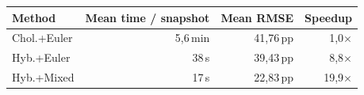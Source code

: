 \begin{tabular}{l r r r}
  \toprule
  \textbf{Method} & \textbf{Mean time / snapshot} & \textbf{Mean RMSE} & \textbf{Speedup} \\
  \midrule
  Chol.+Euler & 5,6\,min & 41,76\,pp & 1,0$\times$ \\
  Hyb.+Euler & 38\,s & 39,43\,pp & 8,8$\times$ \\
  Hyb.+Mixed & 17\,s & 22,83\,pp & 19,9$\times$ \\
  \bottomrule
\end{tabular}